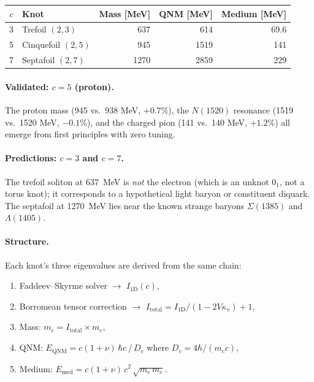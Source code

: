 \begin{center}
\renewcommand{\arraystretch}{1.3}
\begin{tabular}{c l r r r}
\toprule
$c$ & Knot & Mass [MeV] & QNM [MeV] & Medium [MeV] \\
\midrule
3 & Trefoil $(2,3)$ & 637 & 614 & 69.6 \\
5 & Cinquefoil $(2,5)$ & 945 & 1519 & 141 \\
7 & Septafoil $(2,7)$ & 1270 & 2859 & 229 \\
\bottomrule
\end{tabular}
\end{center}

\paragraph{Validated: $c = 5$ (proton).}
The proton mass (945 vs.\ 938 MeV, $+0.7\%$), the $N(1520)$ resonance (1519 vs.\ 1520 MeV, $-0.1\%$), and the charged pion (141 vs.\ 140 MeV, $+1.2\%$) all emerge from first principles with zero tuning.

\paragraph{Predictions: $c = 3$ and $c = 7$.}
The trefoil soliton at 637~MeV is \emph{not} the electron (which is an unknot $0_1$, not a torus knot); it corresponds to a hypothetical light baryon or constituent diquark.  The septafoil at 1270~MeV lies near the known strange baryons $\Sigma(1385)$ and $\Lambda(1405)$.

\paragraph{Structure.}
Each knot's three eigenvalues are derived from the same chain:
\begin{enumerate}
    \item Faddeev--Skyrme solver $\to$ $I_{1\mathrm{D}}(c)$,
    \item Borromean tensor correction $\to$ $I_\mathrm{total} = I_{1\mathrm{D}}/(1 - 2V\kappa_v) + 1$,
    \item Mass: $m_c = I_\mathrm{total} \times m_e$,
    \item QNM: $E_\mathrm{QNM} = c(1+\nu)\,\hbar c\,/\,D_c$ where $D_c = 4\hbar/(m_c c)$,
    \item Medium: $E_\mathrm{med} = c(1+\nu)\,c^2\,\sqrt{m_e\,m_c}$.
\end{enumerate}


